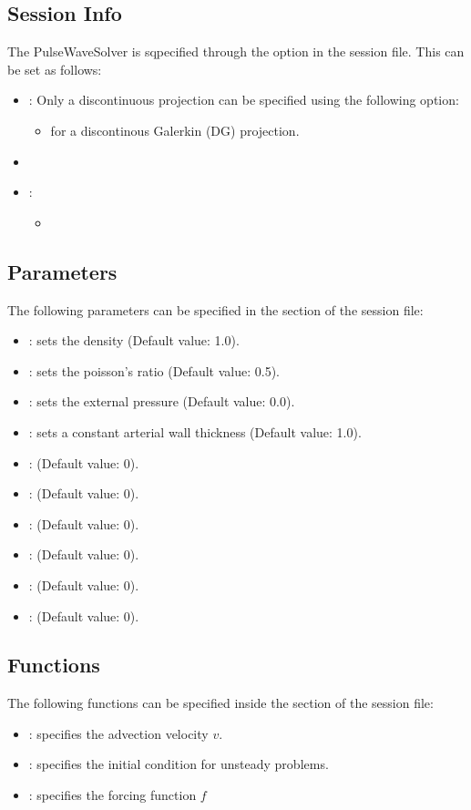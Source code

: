 \subsection{Session Info}
The PulseWaveSolver is sqpecified through the 
option in the session file. This can be set as follows:
\begin{itemize}
\item {}: Only a discontinuous projection can be specified
using the following option:
    \begin{itemize}
    \item {} for a discontinous Galerkin (DG) projection.
    \end{itemize}
\item {}
\item {}:
    \begin{itemize}
    \item {}
    \end{itemize}
\end{itemize}

\subsection{Parameters}

The following parameters can be specified in the  section of
the session file:
\begin{itemize}
\item {}: sets the density (Default value: 1.0).
\item {}: sets the poisson's ratio (Default value: 0.5).
\item {}: sets the external pressure (Default value: 0.0).
\item {}: sets a constant arterial wall thickness (Default value: 1.0).
\item {}: (Default value: 0).
\item {}: (Default value: 0).
\item {}: (Default value: 0).
\item {}: (Default value: 0).
\item {}: (Default value: 0).
\item {}: (Default value: 0).
\end{itemize}

\subsection{Functions}
The following functions can be specified inside the  section
of the session file:
\begin{itemize}
\item {}: specifies the advection velocity $v$.
\item {}: specifies the initial condition for unsteady
 problems.
\item {}: specifies the forcing function $f$
\end{itemize}

